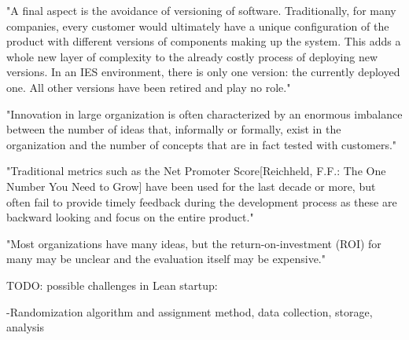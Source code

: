 \documentclass[english]{tktltiki2}
\theoremstyle{definition}
\theoremstyle{remark}
\begin{document}
"A final aspect is the avoidance of versioning of software. Traditionally, for many companies, every customer would ultimately have a unique configuration of the product with different versions of components making up the system. This adds a whole new layer of complexity to the already costly process of deploying new versions. In an IES environment, there is only one version: the currently deployed one. All other versions have been retired and play no role." \cite{bosch2012building}

"Innovation in large organization is often characterized by an enormous imbalance between the number of ideas that, informally or formally, exist in the organization and the number of concepts that are in fact tested with customers." \cite{bosch2012building}

"Traditional metrics such as the Net Promoter Score[Reichheld, F.F.: The One Number You Need to Grow] have been used for the last decade or more, but often fail to provide timely feedback during the development process as these are backward looking and focus on the entire product." \cite{bosch2012building}

"Most organizations have many ideas, but the return-on-investment (ROI) for many may be unclear and the evaluation itself may be expensive." \cite{kohavi2007practical}

TODO: possible challenges in Lean startup: \cite{may2012applying}

-Randomization algorithm and assignment method, data collection, storage, analysis \cite{kohavi2007practical}
\end{document}
